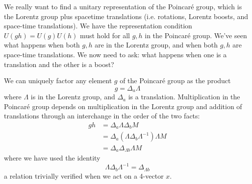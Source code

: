 
We really want to find a unitary representation of the Poincar\'e
group, which is the Lorentz group plus spacetime translations
(i.e. rotations, Lorentz boosts, and space-time translations). We
have the representation condition $U(gh)=U(g)U(h)$ must hold for
all $g,h$ in the Poincar\'e group. We've seen what happens when
both $g,h$ are in the Lorentz group, and when both $g,h$ are
space-time translations. We now need to ask: what happens when
one is a translation and the other is a boost?

We can uniquely factor any element $g$ of the Poincar\'e group as
the product
\begin{equation}%
g = \Delta_{a}\Lambda
\end{equation}
where $\Lambda$ is in the Lorentz group, and $\Delta_a$ is a
translation. Multiplication in the Poincar\'e group depends on
multiplication in the Lorentz group and addition of translations
through an interchange in the order of the two facts:
\begin{subequations}
\begin{align}
gh &= \Delta_{a}\Lambda\Delta_{b}M\\
&= \Delta_{a}(\Lambda\Delta_{b}\Lambda^{-1})\Lambda M\\
&= \Delta_{a}\Delta_{\Lambda b}\Lambda M
\end{align}
\end{subequations}
where we have used the identity
\begin{equation}%
\Lambda\Delta_{b}\Lambda^{-1} = \Delta_{\Lambda b}
\end{equation}
a relation trivially verified when we act on a 4-vector $x$.

